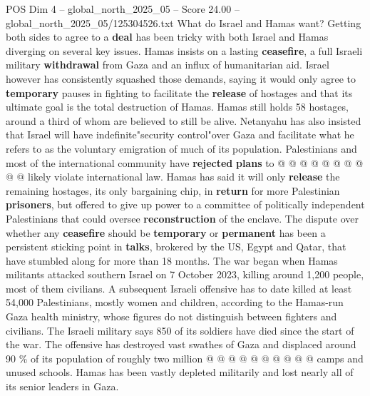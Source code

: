 \begin{textsample}{POS Dim 4 – global\_north\_2025\_05 – Score 24.00 – global\_north\_2025\_05/125304526.txt}
What do Israel and Hamas want?
Getting both sides to agree to a \textbf{deal} has been tricky with both Israel and Hamas diverging on several key issues.
Hamas insists on a lasting \textbf{ceasefire}, a full Israeli military \textbf{withdrawal} from Gaza and an influx of humanitarian aid.
Israel however has consistently squashed those demands, saying it would only agree to \textbf{temporary} pauses in fighting to facilitate the \textbf{release} of hostages and that its ultimate goal is the total destruction of Hamas.
Hamas still holds 58 hostages, around a third of whom are believed to still be alive.
Netanyahu has also insisted that Israel will have indefinite"security control"over Gaza and facilitate what he refers to as the voluntary emigration of much of its population.
Palestinians and most of the international community have \textbf{rejected} \textbf{plans} to @ @ @ @ @ @ @ @ @ @ likely violate international law.
Hamas has said it will only \textbf{release} the remaining hostages, its only bargaining chip, in \textbf{return} for more Palestinian \textbf{prisoners}, but offered to give up power to a committee of politically independent Palestinians that could oversee \textbf{reconstruction} of the enclave.
The dispute over whether any \textbf{ceasefire} should be \textbf{temporary} or \textbf{permanent} has been a persistent sticking point in \textbf{talks}, brokered by the US, Egypt and Qatar, that have stumbled along for more than 18 months.
The war began when Hamas militants attacked southern Israel on 7 October 2023, killing around 1,200 people, most of them civilians.
A subsequent Israeli offensive has to date killed at least 54,000 Palestinians, mostly women and children, according to the Hamas-run Gaza health ministry, whose figures do not distinguish between fighters and civilians.
The Israeli military says 850 of its soldiers have died since the start of the war.
The offensive has destroyed vast swathes of Gaza and displaced around 90 \% of its population of roughly two million @ @ @ @ @ @ @ @ @ @ camps and unused schools.
Hamas has been vastly depleted militarily and lost nearly all of its senior leaders in Gaza.

\end{textsample}
